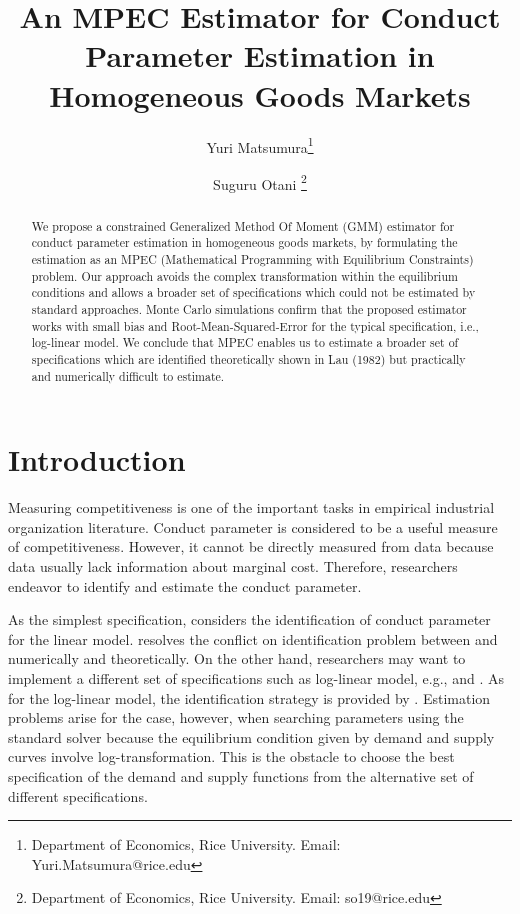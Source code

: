 \documentclass[11pt, a4paper]{article}
\title{An MPEC Estimator for Conduct Parameter Estimation in Homogeneous Goods Markets}
\author{Yuri Matsumura\thanks{Department of Economics, Rice University. Email: Yuri.Matsumura@rice.edu} \and Suguru Otani \thanks{Department of Economics, Rice University. Email: so19@rice.edu
}}
\begin{document}
\maketitle
\begin{abstract}
    We propose a constrained Generalized Method Of Moment (GMM) estimator for conduct parameter estimation in homogeneous goods markets, by formulating the estimation as an MPEC (Mathematical Programming with Equilibrium Constraints) problem. Our approach avoids the complex transformation within the equilibrium conditions and allows a broader set of specifications which could not be estimated by standard approaches. Monte Carlo simulations confirm that the proposed estimator works with small bias and Root-Mean-Squared-Error for the typical specification, i.e., log-linear model. We conclude that MPEC enables us to estimate a broader set of specifications which are identified theoretically shown in Lau (1982) but practically and numerically difficult to estimate.
\end{abstract}


\section{Introduction}
Measuring competitiveness is one of the important tasks in empirical industrial organization literature.
Conduct parameter is considered to be a useful measure of competitiveness. 
However, it cannot be directly measured from data because data usually lack information about marginal cost.
Therefore, researchers endeavor to identify and estimate the conduct parameter.

As the simplest specification, \citet{bresnahan1982oligopoly} considers the identification of conduct parameter for the linear model. \cite{matsumura2023revisiting} resolves the conflict on identification problem between \cite{bresnahan1982oligopoly} and \cite{perloff2012collinearity} numerically and theoretically. On the other hand, researchers may want to implement a different set of specifications such as log-linear model, e.g., \cite{okazaki2022excess} and \cite{merel2009measuring}. As for the log-linear model, the identification strategy is provided by \citet{lau1982identifying}. 
Estimation problems arise for the case, however, when searching parameters using the standard solver because the equilibrium condition given by demand and supply curves involve log-transformation. 
This is the obstacle to choose the best specification of the demand and supply functions from the alternative set of different specifications.
\end{document}
